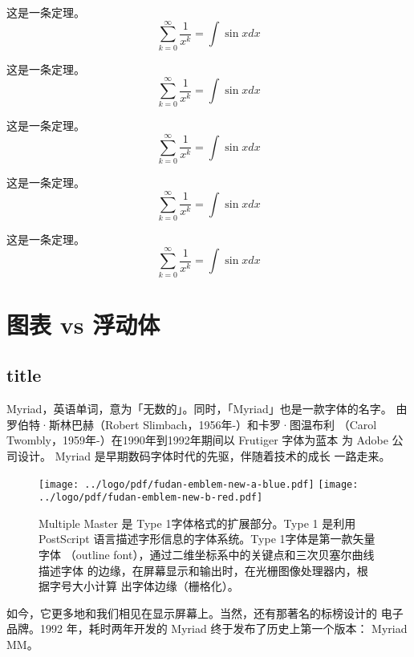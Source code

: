 \documentclass[oneside]{fduthesis}
\begin{document}
\begin{nmb}
这是一条定理。
\[ \sum_{k=0}^{\infty} \frac{1}{x^k} = \int \sin x dx \]
\end{nmb}

\begin{ncb}
这是一条定理。
\[ \sum_{k=0}^{\infty} \frac{1}{x^k} = \int \sin x dx \]
\end{ncb}

\begin{ncb}
这是一条定理。
\[ \sum_{k=0}^{\infty} \frac{1}{x^k} = \int \sin x dx \]
\end{ncb}

\begin{ncb}
这是一条定理。
\[ \sum_{k=0}^{\infty} \frac{1}{x^k} = \int \sin x dx \]
\end{ncb}

\begin{ncb}
这是一条定理。
\[ \sum_{k=0}^{\infty} \frac{1}{x^k} = \int \sin x dx \]
\end{ncb}

\chapter{图表 vs 浮动体}
\section{title}
Myriad，英语单词，意为「无数的」。同时，「Myriad」也是一款字体的名字。
由罗伯特·斯林巴赫（Robert Slimbach，1956年-）和卡罗·图温布利
（Carol Twombly，1959年-）在1990年到1992年期间以 Frutiger 字体为蓝本
为 Adobe 公司设计。 Myriad 是早期数码字体时代的先驱，伴随着技术的成长
一路走来。

\begin{figure}[h]
  \centering
  \texttt{[image: ../logo/pdf/fudan-emblem-new-a-blue.pdf]}
  \texttt{[image: ../logo/pdf/fudan-emblem-new-b-red.pdf]}
  \caption{Multiple Master 是 Type 1字体格式的扩展部分。Type 1 是利用
    PostScript 语言描述字形信息的字体系统。Type 1字体是第一款矢量字体
    （outline font），通过二维坐标系中的关键点和三次贝塞尔曲线描述字体
    的边缘，在屏幕显示和输出时，在光栅图像处理器内，根据字号大小计算
    出字体边缘（栅格化）。}
\end{figure}

如今，它更多地和我们相见在显示屏幕上。当然，还有那著名的标榜设计的
电子品牌。1992 年，耗时两年开发的 Myriad 终于发布了历史上第一个版本：
Myriad MM。
\end{document}
